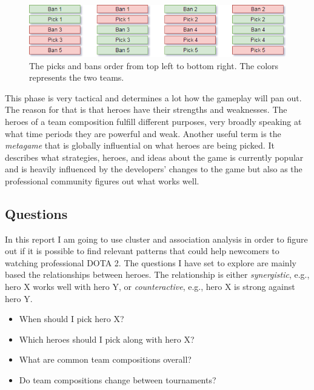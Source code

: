 \documentclass[report.tex]{subfiles}
\begin{document}
\begin{figure}[H]
  \centering
  \includegraphics[width=\textwidth]{./images/dota2}
  \caption{The picks and bans order from top left to bottom right. The colors represents the two teams.}
   \label{fig:picks_bans}
\end{figure}

This phase is very tactical and determines a lot how the gameplay will pan out. The reason for that is that heroes have their strengths and weaknesses. The heroes of a team composition fulfill different purposes, very broadly speaking at what time periods they are powerful and weak. Another useful term is the \textit{metagame} that is globally influential on what heroes are being picked. It describes what strategies, heroes, and ideas about the game is currently popular and is heavily influenced by the developers' changes to the game but also as the professional community figures out what works well.

\subsection*{Questions}

In this report I am going to use cluster and association analysis in order to figure out if it is possible to find relevant patterns that could help newcomers to watching professional DOTA 2. The questions I have set to explore are mainly based the relationships between heroes. The relationship is either \textit{synergistic}, e.g., hero X works well with hero Y, or \textit{counteractive}, e.g., hero X is strong against hero Y.

\begin{itemize}
\item When should I pick hero X?
\item Which heroes should I pick along with hero X?
\item What are common team compositions overall?
\item Do team compositions change between tournaments?
\end{itemize}
\end{document}
